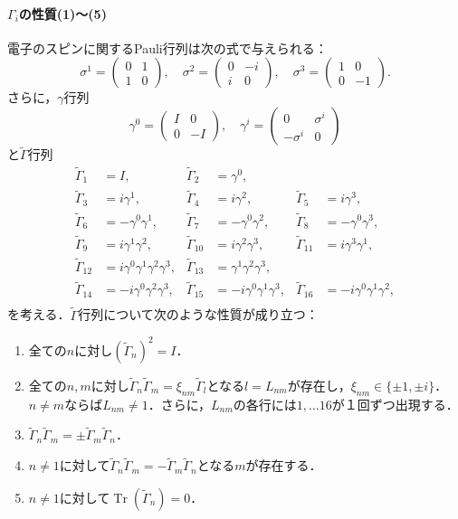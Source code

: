 \paragraph{$\Gamma_i$の性質(1)〜(5)}
電子のスピンに関するPauli行列は次の式で与えられる：
\[\sigma^1 =
\begin{pmatrix}
  0 & 1 \\
  1 & 0
\end{pmatrix}
,\quad\sigma^2 =
\begin{pmatrix}
  0 &  - i \\
  i & 0
\end{pmatrix}
,\quad\sigma^3 =
\begin{pmatrix}
  1 & 0 \\
  0 &  - 1
\end{pmatrix}
.\]
さらに，$\gamma$行列
\[\gamma^0=
\begin{pmatrix}
  I & 0 \\
  0 &  - I
\end{pmatrix}
,\quad\gamma^i =
\begin{pmatrix}
  0 & \sigma^i \\
   - \sigma^i & 0
\end{pmatrix}
\]
と$\tilde{\Gamma}$行列
\begin{align*}
  \tilde{\Gamma}_1 &= I, & \tilde{\Gamma}_2 &= \gamma^0, \\
  \tilde{\Gamma}_3 &= i\gamma^1, & \tilde{\Gamma}_4 &= i\gamma^2, & \tilde{\Gamma}_5 &= i\gamma^3, \\
  \tilde{\Gamma}_6 &=  - \gamma^0\gamma^1, & \tilde{\Gamma}_7 &=  - \gamma^0\gamma^2, & \tilde{\Gamma}_8 &=  - \gamma^0\gamma^3, \\
  \tilde{\Gamma}_9 &= i\gamma^1\gamma^2, & \tilde{\Gamma}_{10} &= i\gamma^2\gamma^3, & \tilde{\Gamma}_{11} &= i\gamma^3\gamma^1, \\
  \tilde{\Gamma}_{12} &= i\gamma^0\gamma^1\gamma^2\gamma^3, & \tilde{\Gamma}_{13} &= \gamma^1\gamma^2\gamma^3, \\
  \tilde{\Gamma}_{14} &=  - i\gamma^0\gamma^2\gamma^3, & \tilde{\Gamma}_{15} &=  - i\gamma^0\gamma^1\gamma^3, & \tilde{\Gamma}_{16} &=  - i\gamma^0\gamma^1\gamma^2, \\
\end{align*}
を考える．$\tilde{\Gamma}$行列について次のような性質が成り立つ：
\begin{enumerate}
  \item 全ての$n$に対し$(\tilde{\Gamma}_n)^2 = I$．
  \item 全ての$n,m$に対し$\tilde{\Gamma}_n\tilde{\Gamma}_m=\xi_{nm}\tilde{\Gamma}_l$となる$l=L_{nm}$が存在し，$\xi_{nm}\in\{\pm1,\pm i\}$．$n\neq m$ならば$L_{nm}\neq 1$．さらに，$L_{nm}$の各行には$1,\ldots 16$が１回ずつ出現する．
  \item $\tilde{\Gamma}_n\tilde{\Gamma}_m=\pm\tilde{\Gamma}_m\tilde{\Gamma}_n$．
  \item $n\neq 1$に対して$\tilde{\Gamma}_n\tilde{\Gamma}_m= - \tilde{\Gamma}_m\tilde{\Gamma}_n$となる$m$が存在する．
  \item $n\neq 1$に対して$\operatorname{Tr}(\tilde{\Gamma}_n)=0$．
\end{enumerate}

